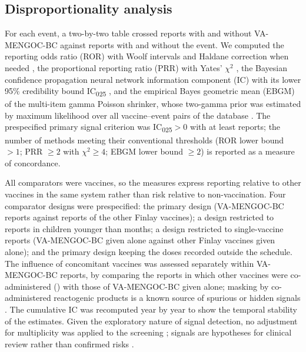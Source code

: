 \documentclass[11pt]{article}
\begin{document}
\subsection{Disproportionality analysis}\label{sec:m-disp}
For each event, a two-by-two table crossed reports with and without VA-MENGOC-BC against
reports with and without the event. We computed the reporting odds ratio (ROR) with Woolf
intervals and Haldane correction when needed \cite{vanPuijenbroek2002,Woolf1955,Haldane1956},
the proportional reporting ratio (PRR) with Yates' $\chi^2$ \cite{Evans2001}, the Bayesian
confidence propagation neural network information component (IC) with its lower 95\% credibility
bound IC\textsubscript{025} \cite{Bate1998,Noren2013}, and the empirical Bayes geometric mean
(EBGM) of the multi-item gamma Poisson shrinker, whose two-gamma prior was estimated by maximum
likelihood over all vaccine--event pairs of the database \cite{DuMouchel1999,Szarfman2002}. The
prespecified primary signal criterion was IC\textsubscript{025}${}>0$ with at least
\PODispMinReports{} reports; the number of methods meeting their conventional thresholds (ROR lower bound ${}>1$;
PRR ${}\geq2$ with $\chi^2\geq4$; EBGM lower bound ${}\geq2$) is reported as a measure of
concordance.

All comparators were vaccines, so the measures express reporting relative to other vaccines in
the same system rather than risk relative to non-vaccination. Four comparator designs were
prespecified: the primary design (VA-MENGOC-BC reports against reports of the other Finlay
vaccines); a design restricted to reports in children younger than \POInfantMonths{} months; a
design restricted to single-vaccine reports (VA-MENGOC-BC given alone against other Finlay
vaccines given alone); and the primary design keeping the doses recorded outside the schedule.
The influence of concomitant vaccines was assessed separately within VA-MENGOC-BC reports, by
comparing the reports in which other vaccines were co-administered (\PONTargetCoadmin) with those
of VA-MENGOC-BC given alone; masking by co-administered reactogenic products is a known source of
spurious or hidden signals \cite{Maignen2014}. The cumulative IC was
recomputed year by year to show the temporal stability of the estimates. Given the exploratory
nature of signal detection, no adjustment for multiplicity was applied to the screening
\cite{Rothman1990}; signals are hypotheses for clinical review rather than confirmed risks
\cite{Fusaroli2026Pitfalls,Fusaroli2026Causal}.
\end{document}
